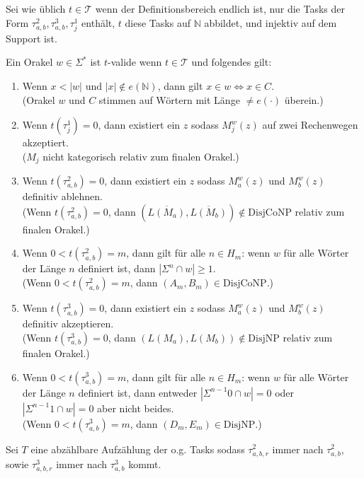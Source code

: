 \documentclass[nofonts]{uebung}
\def\DisjNP{\ensuremath{\mathrm{DisjNP}}}
\def\DisjCoNP{\ensuremath{\mathrm{DisjCoNP}}}
\begin{document}
Sei wie üblich $t\in \mathcal T$ wenn der Definitionsbereich endlich ist, nur die Tasks der Form $\tau^2_{a,b}, \tau^3_{a,b}, \tau^1_j$ enthält, $t$ diese Tasks auf $\mathbb N$ abbildet, und injektiv auf dem Support ist.

Ein Orakel $w\in\Sigma^*$ ist $t$-valide wenn $t\in\mathcal T$ und folgendes gilt:
\begin{enumerate}[label={V\arabic*}]
    \item Wenn $x<|w|$ und $|x|\not\in e(\mathbb N)$, dann gilt $x\in w\iff x\in C$.\\
        (Orakel $w$ und $C$ stimmen auf Wörtern mit Länge $\neq e(\cdot)$ überein.)
    \item Wenn $t(\tau^1_j)=0$, dann existiert ein $z$ sodass $M_j^w(z)$ auf zwei Rechenwegen akzeptiert.\\
        ($M_j$ nicht kategorisch relativ zum finalen Orakel.)
    \item Wenn $t(\tau^2_{a,b})=0$, dann existiert ein $z$ sodass $M_a^w(z)$ und $M_b^w(z)$ definitiv ablehnen.\\
        (Wenn $t(\tau^2_{a,b})=0$, dann $(\overline{L(M_a)}, \overline{ L(M_b)})\not\in \DisjCoNP$ relativ zum finalen Orakel.)
    \item Wenn $0<t(\tau^2_{a,b})=m$, dann gilt für alle $n\in H_m$: wenn $w$ für alle Wörter der Länge $n$ definiert ist, dann $|\Sigma^n\cap w|\geq 1$.\\
        (Wenn $0<t(\tau^2_{a,b})=m$, dann $(A_m,B_m)\in\DisjCoNP$.)
    \item Wenn $t(\tau^3_{a,b})=0$, dann existiert ein $z$ sodass $M_a^w(z)$ und $M_b^w(z)$ definitiv akzeptieren.\\
        (Wenn $t(\tau^3_{a,b})=0$, dann $({L(M_a)}, { L(M_b)})\not\in \DisjNP$ relativ zum finalen Orakel.)
    \item Wenn $0<t(\tau^3_{a,b})=m$, dann gilt für alle $n\in H_m$: wenn $w$ für alle Wörter der Länge $n$ definiert ist, dann entweder $|\Sigma^{n-1}0\cap w|=0$ oder $|\Sigma^{n-1}1\cap w|=0$ aber nicht beides.\\
        (Wenn $0<t(\tau^3_{a,b})=m$, dann $(D_m,E_m)\in\DisjNP$.)
\end{enumerate}

Sei $T$ eine abzählbare Aufzählung der o.g. Tasks sodass $\tau^2_{a,b,r}$ immer nach $\tau^2_{a,b}$, sowie $\tau^3_{a,b,r}$ immer nach $\tau^3_{a,b}$ kommt.
\end{document}
